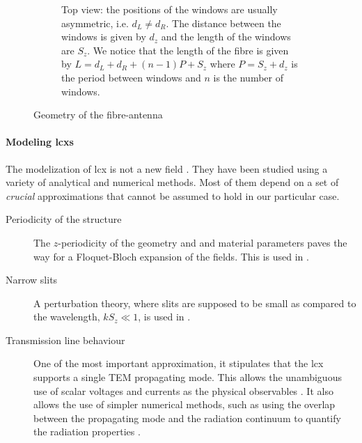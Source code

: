 \begin{figure}
\begin{subfigure}[b]{\textwidth}
   \vspace{0.25cm}
   \caption{Top view: the positions of the windows are usually asymmetric, i.e. $d_L\neq d_R$. The distance between
	    the windows is given by $d_z$ and the length of the windows are $S_z$. We notice that the length of the 
	    fibre is given by $L=d_L+d_R+(n-1)P+S_z$ where $P=S_z+d_z$ is the period between windows and $n$ is the number
	    of windows.}
   \label{fig:active.antennae.fibre-antenna.topview}
  \end{subfigure}
  \caption{Geometry of the fibre-antenna}
  \label{fig:active.antennae.fibre-antenna}
\end{figure}

\paragraph{Modeling \glspl{lcx}}
The modelization of \gls{lcx} is not a new field \cite{DEL1980,WAN2001,KIM2007,ADD2008}.
They have been studied using a variety of analytical and numerical methods. Most of them 
depend on a set of \textit{crucial} approximations that cannot be assumed to hold 
in our particular case.

\begin{description}
	\item [Periodicity of the structure] The $z$-periodicity of the geometry and 
		and material parameters paves the way for a Floquet-Bloch expansion of the 
		fields. This is used in \cite{WAN2001}.
	\item [Narrow slits] A perturbation theory, where slits are supposed to be 
			small as compared to the wavelength, $kS_z\ll1$, is used in \cite{KIM2007}.
	\item [Transmission line behaviour] One of the most important approximation, it stipulates
			that the \gls{lcx} supports a single TEM propagating mode. This allows the 
			unambiguous use of scalar voltages and currents as the physical observables
			\cite{PAU2007}. It also allows
			the use of simpler numerical methods, such as using the overlap between the 
			propagating mode and the radiation continuum to quantify the radiation 
			properties \cite{SHI1989,ADD2008}. 
\end{description}

